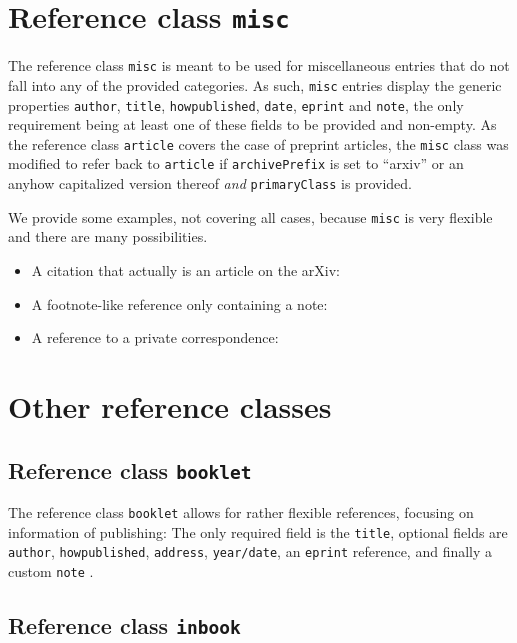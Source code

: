 \documentclass[a4paper,twocolumn,11pt]{quantumarticle}
\begin{document}
\section{Reference class \texttt{misc}}\label{sec:misc}
The reference class \texttt{misc} is meant to be used for miscellaneous entries that do not fall into any of the provided categories.
As such, \texttt{misc} entries display the generic properties \texttt{author}, \texttt{title}, \texttt{howpublished}, \texttt{date}, \texttt{eprint} and \texttt{note}, the only requirement being at least one of these fields to be provided and non-empty.
As the reference class \texttt{article} covers the case of preprint articles, the \texttt{misc} class was modified to refer back to \texttt{article} if \texttt{archivePrefix} is set to ``arxiv'' or an anyhow capitalized version thereof \emph{and} \texttt{primaryClass} is provided.

We provide some examples, not covering all cases, because \texttt{misc} is very flexible and there are many possibilities.
\begin{itemize}
    \item A citation that actually is an article on the arXiv: 
    \item A footnote-like reference only containing a note: 
    \item A reference to a private correspondence: 
\end{itemize}


\section{Other reference classes}\label{sec:other}
\subsection{Reference class \texttt{booklet}}\label{sec:booklet}
The reference class \texttt{booklet} allows for rather flexible references, focusing on information of publishing:
The only required field is the \texttt{title}, optional fields are \texttt{author}, \texttt{howpublished}, \texttt{address}, \texttt{year/date}, an \texttt{eprint} reference, and finally a custom \texttt{note} .

\subsection{Reference class \texttt{inbook}}\label{sec:inbook}
\end{document}
